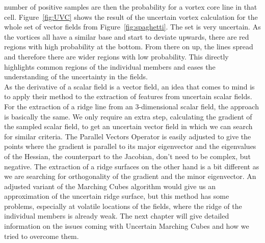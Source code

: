 number of positive samples are then the probability for a vortex core
line in that cell. Figure~\ref{fig:UVC} shows the result of the
uncertain vortex calculation for the whole set of vector fields from
Figure~\ref{fig:spaghetti}. The set is very uncertain. As the vortices
all have a similar base and start to deviate upwards, there are red
regions with high probability at the bottom. From there on up, the lines
spread and therefore there are wider regions with low probability. This
directly highlights common regions of the individual members and eases
the understanding of the uncertainty in the fields.\\
\indent As the derivative of a scalar field is a vector field, an idea
that comes to mind is to apply their method to the extraction of
features from uncertain scalar fields. For the extraction of a ridge
line from an 3-dimensional scalar field, the approach is basically the
same. We only require an extra step, calculating the gradient of the
sampled scalar field, to get an uncertain vector field in which we can
search for similar criteria. The Parallel Vectors Operator is easily
adjusted to give the points where the gradient is parallel to its major
eigenvector and the eigenvalues of the Hessian, the counterpart to the
Jacobian, don't need to be complex, but negative. The extraction of a
ridge surfaces on the other hand is a bit different as we are searching
for orthogonality of the gradient and the minor eigenvector. An adjusted
variant of the Marching Cubes algorithm would give us an approximation
of the uncertain ridge surface, but this method has some problems,
especially at volatile locations of the fields, where the ridge of the
individual members is already weak. The next chapter will give detailed
information on the issues coming with Uncertain Marching Cubes and how
we tried to overcome them.

